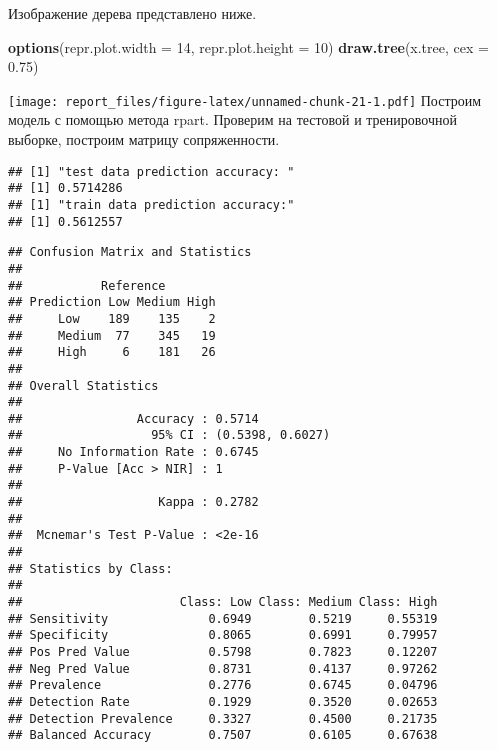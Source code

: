 \documentclass[
]{article}
\newenvironment{Shaded}{\begin{snugshade}}{\end{snugshade}}
\newcommand{\DataTypeTok}[1]{\textcolor[rgb]{0.13,0.29,0.53}{#1}}
\newcommand{\DecValTok}[1]{\textcolor[rgb]{0.00,0.00,0.81}{#1}}
\newcommand{\FloatTok}[1]{\textcolor[rgb]{0.00,0.00,0.81}{#1}}
\newcommand{\KeywordTok}[1]{\textcolor[rgb]{0.13,0.29,0.53}{\textbf{#1}}}
\newcommand{\NormalTok}[1]{#1}
\newcommand{\OperatorTok}[1]{\textcolor[rgb]{0.81,0.36,0.00}{\textbf{#1}}}
\newcommand{\StringTok}[1]{\textcolor[rgb]{0.31,0.60,0.02}{#1}}
\begin{document}
Изображение дерева представлено ниже.

\begin{Shaded}
\begin{Highlighting}[]
\KeywordTok{options}\NormalTok{(}\DataTypeTok{repr.plot.width =} \DecValTok{14}\NormalTok{, }\DataTypeTok{repr.plot.height =} \DecValTok{10}\NormalTok{)}
\KeywordTok{draw.tree}\NormalTok{(x.tree, }\DataTypeTok{cex =} \FloatTok{0.75}\NormalTok{)}
\end{Highlighting}
\end{Shaded}

\texttt{[image: report\_files/figure-latex/unnamed-chunk-21-1.pdf]}
Построим модель с помощью метода rpart. Проверим на тестовой и
тренировочной выборке, построим матрицу сопряженности.

\begin{Shaded}
\end{Shaded}

\begin{verbatim}
## [1] "test data prediction accuracy: "
## [1] 0.5714286
## [1] "train data prediction accuracy:"
## [1] 0.5612557
\end{verbatim}

\begin{verbatim}
## Confusion Matrix and Statistics
## 
##           Reference
## Prediction Low Medium High
##     Low    189    135    2
##     Medium  77    345   19
##     High     6    181   26
## 
## Overall Statistics
##                                           
##                Accuracy : 0.5714          
##                  95% CI : (0.5398, 0.6027)
##     No Information Rate : 0.6745          
##     P-Value [Acc > NIR] : 1               
##                                           
##                   Kappa : 0.2782          
##                                           
##  Mcnemar's Test P-Value : <2e-16          
## 
## Statistics by Class:
## 
##                      Class: Low Class: Medium Class: High
## Sensitivity              0.6949        0.5219     0.55319
## Specificity              0.8065        0.6991     0.79957
## Pos Pred Value           0.5798        0.7823     0.12207
## Neg Pred Value           0.8731        0.4137     0.97262
## Prevalence               0.2776        0.6745     0.04796
## Detection Rate           0.1929        0.3520     0.02653
## Detection Prevalence     0.3327        0.4500     0.21735
## Balanced Accuracy        0.7507        0.6105     0.67638
\end{verbatim}
\end{document}
